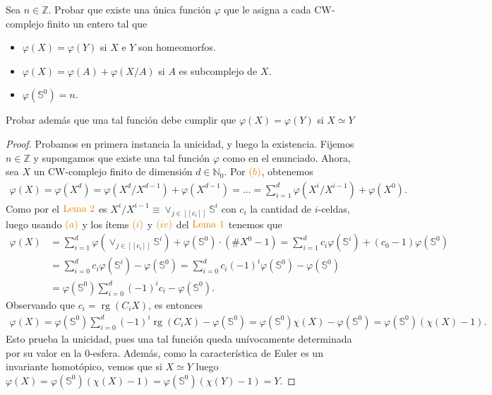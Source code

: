 \documentclass[11pt]{article}
\newcommand{\N}{\mathbb{N}}
\newcommand{\Z}{\mathbb{Z}}
\newcommand{\Ss}{\mathbb{S}}
\newcommand{\nat}[1]{[\![#1]\!]}
\newcommand{\paint}[1]{\color{color}{#1}}
\newenvironment{exercise}[2][Ejercicio]{\begin{trivlist}
\item[\hskip \labelsep \paint{{\bfseries #1}}\hskip \labelsep {\bfseries #2.}]}{\end{trivlist}}
\begin{document}
\begin{exercise}{8} Sea $n \in \Z$. Probar que existe una \'unica funci\'on $\varphi$ que le asigna a cada CW-complejo finito un entero tal que 
\begin{itemize}
\item[(a)] $\varphi(X) = \varphi(Y)$ si $X$ e $Y$ son homeomorfos.
\item[(b)] $\varphi(X) = \varphi(A) + \varphi(X/A)$ si $A$ es subcomplejo de $X$.
\item[(c)] $\varphi(\Ss^0) = n$.
\end{itemize}
Probar adem\'as que una tal funci\'on debe cumplir que $\varphi(X) = \varphi(Y)$ si $X \simeq Y$

\end{exercise}
\begin{proof} Probamos en primera instancia la unicidad, y luego la existencia. Fijemos $n \in \Z$ y supongamos que existe una tal funci\'on $\varphi$ como en el enunciado. Ahora, sea $X$ un CW-complejo finito de dimensi\'on $d \in \N_0$. Por $\paint{(b)}$, obtenemos
\begin{align*}
\varphi(X) = \varphi(X^d) = \varphi(X^d/X^{d-1}) + \varphi(X^{d-1}) = \dots = \sum_{i=1}^d\varphi(X^i/X^{i-1}) + \varphi(X^0).
\end{align*}
Como por el $\paint{\text{Lema $2$}}$ es $X^i/X^{i-1} \equiv \vee_{j \in \nat{c_i}}\Ss^i$ con $c_i$ la cantidad de $i$-celdas, luego usando $\paint{(a)}$ y los \'items $\paint{(i)}$ y $\paint{(iv)}$ del $\paint{\text{Lema $1$}}$ tenemos que
\begin{align*}
\varphi(X) &= \sum_{i=1}^d \varphi(\vee_{j \in \nat{c_i}}\Ss^i) + \varphi(\Ss^0) \cdot (\#X^0-1) = \sum_{i=1}^d c_i\varphi(\Ss^i) + (c_0-1)\varphi(\Ss^0)\\
&= \sum_{i=0}^dc_i \varphi(\Ss^i) - \varphi(\Ss^0) = \sum_{i=0}^dc_i(-1)^i\varphi(\Ss^0) -\varphi(\Ss^0)\\
& = \varphi(\Ss^0)\sum_{i=0}^d(-1)^ic_i - \varphi(\Ss^0).
\end{align*}
Observando que $c_i = \operatorname{rg}(C_iX)$, es entonces
\begin{align*}
\varphi(X) = \varphi(\Ss^0)\sum_{i=0}^d(-1)^i\operatorname{rg}(C_iX) - \varphi(\Ss^0) = \varphi(\Ss^0) \chi(X) - \varphi(\Ss^0) = \varphi(\Ss^0)(\chi(X)-1).
\end{align*}
Esto prueba la unicidad, pues una tal funci\'on queda un\'ivocamente determinada por su valor en la $0$-esfera. Adem\'as, como la caracter\'istica de Euler es un invariante homot\'opico, vemos que si $X \simeq Y$ luego $\varphi(X) = \varphi(\Ss^0)(\chi(X)-1) = \varphi(\Ss^0)(\chi(Y)-1) = Y$.


\end{proof}
\end{document}
